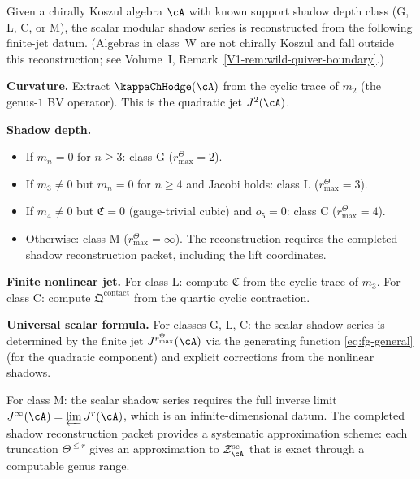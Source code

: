 \begin{construction}
Given a chirally Koszul algebra $\cA$ with known support shadow depth
class (G, L, C, or M), the scalar modular shadow series is
reconstructed from the following
finite-jet datum.
(Algebras in class~W are not chirally Koszul and fall outside this
reconstruction; see Volume~I, Remark~\ref*{V1-rem:wild-quiver-boundary}.)

\medskip\noindent\textbf{Curvature.}
Extract $\kappaChHodge(\cA)$ from the cyclic trace of $m_2$ (the genus-$1$ BV operator).
This is the quadratic jet $J^2(\cA)$.

\medskip\noindent\textbf{Shadow depth.}
\begin{itemize}
\item If $m_n = 0$ for $n \geq 3$: class G (\(r^\Theta_{\max} = 2\)).
\item If $m_3 \neq 0$ but $m_n = 0$ for $n \geq 4$ and Jacobi holds: class L
 (\(r^\Theta_{\max} = 3\)).
\item If $m_4 \neq 0$ but $\mathfrak{C} = 0$ (gauge-trivial cubic) and $o_5 = 0$:
 class C (\(r^\Theta_{\max} = 4\)).
\item Otherwise: class M (\(r^\Theta_{\max} = \infty\)). The reconstruction requires the
 completed shadow reconstruction packet, including the lift coordinates.
\end{itemize}

\medskip\noindent\textbf{Finite nonlinear jet.}
For class L: compute $\mathfrak{C}$ from the cyclic trace of $m_3$. For class C:
compute $\mathfrak{Q}^{\mathrm{contact}}$ from the quartic cyclic contraction.

\medskip\noindent\textbf{Universal scalar formula.}
For classes G, L, C: the scalar shadow series is determined by the finite jet
\(J^{r^\Theta_{\max}}(\cA)\) via the generating function \eqref{eq:fg-general} (for the
quadratic component) and explicit corrections from the nonlinear shadows.

For class M: the scalar shadow series requires the full inverse limit
$J^\infty(\cA) = \varprojlim J^r(\cA)$, which is an infinite-dimensional datum.
The completed shadow reconstruction packet provides a systematic approximation scheme: each truncation
\(\Theta^{\leq r}\) gives an approximation to
\(\mathcal Z^{\mathrm{sc}}_\cA\) that is exact through a computable
genus range.
\end{construction}

